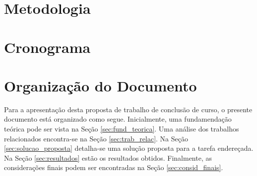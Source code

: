 \section{Metodologia}\label{sec:metodo}


\section{Cronograma}\label{sec:crono}


\section{Organização do Documento}
Para a apresentação desta proposta de trabalho de conclusão de curso, o presente documento está organizado como segue. Inicialmente, uma fundamendação teórica pode ser vista na Seção \ref{sec:fund_teorica}. Uma análise dos trabalhos relacionados encontra-se na Seção \ref{sec:trab_relac}. Na Seção \ref{sec:solucao_proposta} detalha-se uma solução proposta para a tarefa endereçada. Na Seção \ref{sec:resultados} estão os resultados obtidos. Finalmente, as considerações finais podem ser encontradas na Seção \ref{sec:consid_finais}.
